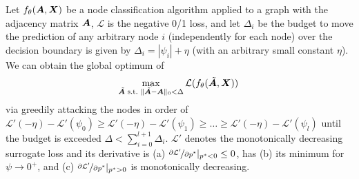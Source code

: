 \documentclass[sigconf,authordraft]{acmart}
\newcommand{\adj}{\mA}
\newcommand{\features}{\mX}
\begin{document}
\begin{theorem}\label{theorem:goodsurrogate}
  Let \(f_{\theta}(\adj, \features)\) be a node classification algorithm applied to a graph with the adjacency matrix \(\adj\), \(\mathcal{L}\) is the negative 0/1 loss, and let \(\Delta_i\) be the budget to move the prediction of any arbitrary node \(i\) (independently for each node) over the decision boundary is given by \(\Delta_i = |\psi_i| + \eta\) (with an arbitrary small constant \(\eta\)). 
  We can obtain the global optimum of
  \begin{equation}\label{eq:goodsurrogate}
    \max_{\tilde{\adj}\text{ s.t.\ }\|\tilde{\adj} - \adj\|_0 < \Delta} \mathcal{L}(f_{\theta}(\tilde{\adj}, \features))\,
  \end{equation}
  via greedily attacking the nodes in order of \(\mathcal{L}'(-\eta) - \mathcal{L}'(\psi_0) \ge \mathcal{L}'(-\eta) - \mathcal{L}'(\psi_1) \ge \dots \ge \mathcal{L}'(-\eta) - \mathcal{L}'(\psi_l)\) until the budget is exceeded \(\Delta < \sum_{i=0}^{l+1} \Delta_i\). \(\mathcal{L}'\) denotes the monotonically decreasing surrogate loss and its derivative is (a) \(\nicefrac{\partial \mathcal{L}'}{\partial p^*} |_{p^* < 0} \le 0\), has (b) its minimum for \(\psi \to 0^+\), and (c) \(\nicefrac{\partial \mathcal{L}'}{\partial p^*}|_{p^* > 0}\) is monotonically decreasing.
\end{theorem}
\end{document}
